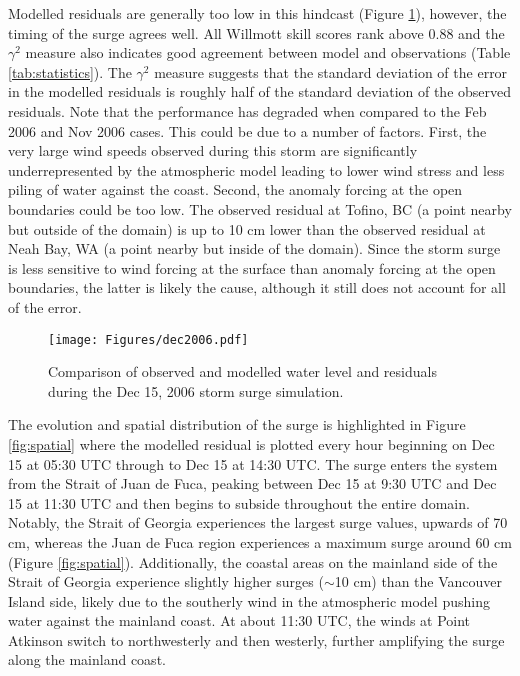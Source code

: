 \documentclass[letterpaper]{tATO2e}
\begin{document}
Modelled residuals are generally too low in this hindcast (Figure \ref{fig:dec2006}), however, the timing of the surge agrees well. All Willmott skill scores rank above 0.88 and the $\gamma^2$ measure also indicates good agreement between model and observations (Table \ref{tab:statistics}). The $\gamma^2$ measure suggests that the standard deviation of the error in the modelled residuals is roughly half of the standard deviation of the observed residuals. Note that the performance has degraded when compared to the Feb 2006 and Nov 2006 cases. This could be due to a number of factors. First, the very large wind speeds observed during this storm are significantly underrepresented by the atmospheric model leading to lower wind stress and less piling of water against the coast. Second, the anomaly forcing at the open boundaries could be too low. The observed residual at Tofino, BC (a point nearby but outside of the domain) is up to 10 cm  lower than the observed residual at Neah Bay, WA (a point nearby but inside of the domain). {\color{red} Since the storm surge is less sensitive to wind forcing at the surface than anomaly forcing at the open boundaries, the latter is likely the cause, although it still does not account for all of the error.} 

\begin{figure}
\centering
\texttt{[image: Figures/dec2006.pdf]}
\caption{Comparison of observed and modelled water level and residuals during the Dec 15, 2006 storm surge simulation. }
\label{fig:dec2006}
\end{figure}

The evolution and spatial distribution of the surge is highlighted in Figure \ref{fig:spatial} where the modelled residual is plotted every hour beginning on Dec 15 at 05:30 UTC through to Dec 15 at 14:30 UTC. The surge enters the system from the Strait of Juan de Fuca, peaking between Dec 15 at 9:30 UTC and Dec 15 at 11:30 UTC and then begins to subside throughout the entire domain. Notably, the Strait of Georgia experiences the largest surge values, upwards of {\color{red}70} cm, whereas the Juan de Fuca region experiences a maximum surge around {\color{red}60} cm {\color{red} (Figure \ref{fig:spatial})}. Additionally, the coastal areas on the mainland side of the Strait of Georgia experience slightly higher surges ($\sim$10 cm) than the Vancouver Island side, likely due to the southerly wind in the atmospheric model pushing water against the mainland coast. At about 11:30 UTC, the winds at Point Atkinson switch to northwesterly and then westerly, further amplifying the surge along the mainland coast. 
\end{document}
